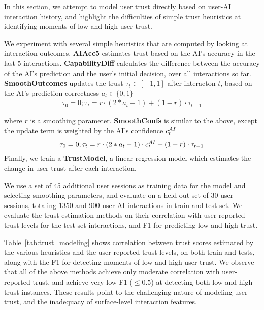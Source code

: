 In this section, we attempt to model user trust directly based on user-AI interaction history, and highlight the difficulties of simple trust heuristics at identifying moments of low and high user trust.

We experiment with several simple heuristics that are computed by looking at interaction outcomes. \textbf{AIAcc5} estimates trust based on the AI's accuracy in the last 5 interactions. \textbf{CapabilityDiff} calculates the difference between the accuracy of the AI's prediction and the user's initial decision, over all interactions so far. 
\textbf{SmoothOutcomes} updates the trust $\tau_t \in [-1, 1]$ after interacton $t$, based on the AI's prediction correctness $a_t \in \{0,1\}$
\vspace{-0.5em}
\begin{align*}
    \tau_0 = 0; \tau_t = r \cdot (2 * a_t-1) + (1-r) \cdot \tau_{t-1}
\end{align*}

where $r$ is a smoothing parameter. \textbf{SmoothConfs} is similar to the above, except the update term is weighted by the AI's confidence $c^{AI}_t$
\vspace{-0.5em}
\begin{align*}
    \tau_0 = 0; \tau_t = r \cdot (2 * a_t-1) \cdot c^{AI}_t + (1-r) \cdot \tau_{t-1}
\end{align*}
Finally, we train a \textbf{TrustModel}, a linear regression model which estimates the change in user trust after each interaction. 

We use a set of 45 additional user sessions as training data for the model and selecting smoothing parameters, and evaluate on a held-out set of 30 user sessions, totaling 1350 and 900 user-AI interactions in train and test set. 
We evaluate the trust estimation methods on their correlation with user-reported trust levels for the test set interactions, and F1 for predicting low and high trust. 



Table~\ref{tab:trust_modeling} shows correlation between trust scores estimated by the various heuristics and the user-reported trust levels, on both train and tests, along with the F1 for detecting moments of low and high user trust. 
We observe that all of the above methods achieve only moderate correlation with user-reported trust, and achieve very low F1 ($\leq 0.5$) at detecting both low and high trust instances. 
These results point to the challenging nature of modeling user trust, and the inadequacy of surface-level interaction features. 
